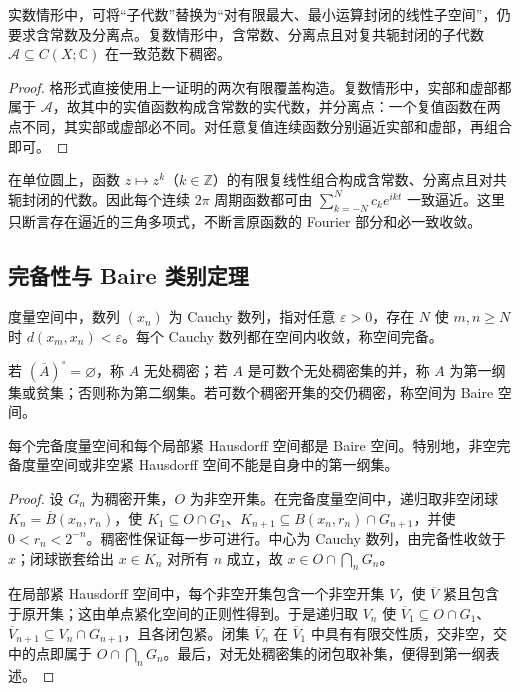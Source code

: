 \begin{corollary}[格形式与复数形式]\label{cor:y0-stone-complex}
实数情形中，可将“子代数”替换为“对有限最大、最小运算封闭的线性子空间”，仍要求含常数及分离点。复数情形中，含常数、分离点且对复共轭封闭的子代数 $\mathcal A\subseteq C(X;\mathbb C)$ 在一致范数下稠密。
\end{corollary}
\begin{proof}
格形式直接使用上一证明的两次有限覆盖构造。复数情形中，实部和虚部都属于 $\mathcal A$，故其中的实值函数构成含常数的实代数，并分离点：一个复值函数在两点不同，其实部或虚部必不同。对任意复值连续函数分别逼近实部和虚部，再组合即可。
\end{proof}

\begin{example}[三角多项式的一致稠密性]
在单位圆上，函数 $z\mapsto z^k$（$k\in\mathbb Z$）的有限复线性组合构成含常数、分离点且对共轭封闭的代数。因此每个连续 $2\pi$ 周期函数都可由 $\sum_{k=-N}^Nc_ke^{ikt}$ 一致逼近。这里只断言存在逼近的三角多项式，不断言原函数的 Fourier 部分和必一致收敛。
\end{example}

\subsection{完备性与 Baire 类别定理}
\begin{definition}\label{def:y0-baire}
度量空间中，数列 $(x_n)$ 为 Cauchy 数列，指对任意 $\varepsilon>0$，存在 $N$ 使 $m,n\ge N$ 时 $d(x_m,x_n)<\varepsilon$。每个 Cauchy 数列都在空间内收敛，称空间完备。

若 $(\overline A)^\circ=\varnothing$，称 $A$ 无处稠密；若 $A$ 是可数个无处稠密集的并，称 $A$ 为第一纲集或贫集；否则称为第二纲集。若可数个稠密开集的交仍稠密，称空间为 Baire 空间。
\end{definition}

\begin{theorem}\label{thm:y0-baire}
每个完备度量空间和每个局部紧 Hausdorff 空间都是 Baire 空间。特别地，非空完备度量空间或非空紧 Hausdorff 空间不能是自身中的第一纲集。
\end{theorem}
\begin{proof}
设 $G_n$ 为稠密开集，$O$ 为非空开集。在完备度量空间中，递归取非空闭球 $K_n=\overline B(x_n,r_n)$，使 $K_1\subseteq O\cap G_1$、$K_{n+1}\subseteq B(x_n,r_n)\cap G_{n+1}$，并使 $0<r_n<2^{-n}$。稠密性保证每一步可进行。中心为 Cauchy 数列，由完备性收敛于 $x$；闭球嵌套给出 $x\in K_n$ 对所有 $n$ 成立，故 $x\in O\cap\bigcap_nG_n$。

在局部紧 Hausdorff 空间中，每个非空开集包含一个非空开集 $V$，使 $\overline V$ 紧且包含于原开集；这由单点紧化空间的正则性得到。于是递归取 $V_n$ 使 $\overline V_1\subseteq O\cap G_1$、$\overline V_{n+1}\subseteq V_n\cap G_{n+1}$，且各闭包紧。闭集 $\overline V_n$ 在 $\overline V_1$ 中具有有限交性质，交非空，交中的点即属于 $O\cap\bigcap_nG_n$。最后，对无处稠密集的闭包取补集，便得到第一纲表述。
\end{proof}

